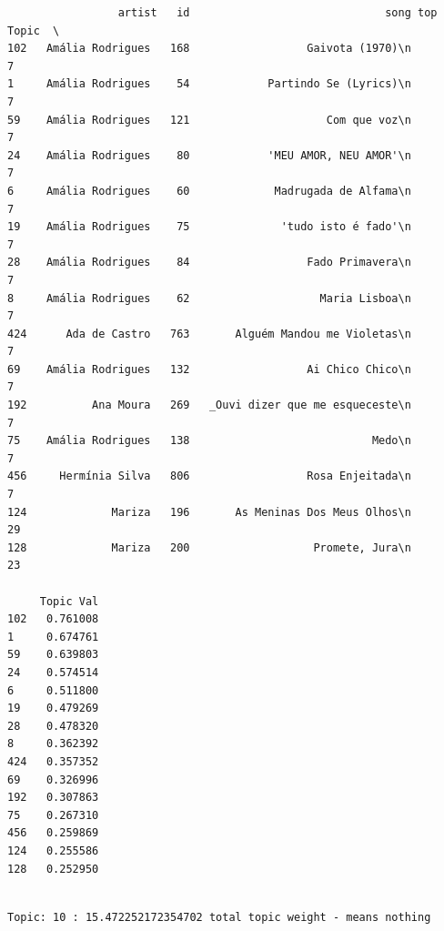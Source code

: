 \documentclass[11pt]{article}
\begin{document}
    
    \begin{verbatim}
                 artist   id                              song top Topic  \
102   Amália Rodrigues   168                  Gaivota (1970)\n         7   
1     Amália Rodrigues    54            Partindo Se (Lyrics)\n         7   
59    Amália Rodrigues   121                     Com que voz\n         7   
24    Amália Rodrigues    80            'MEU AMOR, NEU AMOR'\n         7   
6     Amália Rodrigues    60             Madrugada de Alfama\n         7   
19    Amália Rodrigues    75              'tudo isto é fado'\n         7   
28    Amália Rodrigues    84                  Fado Primavera\n         7   
8     Amália Rodrigues    62                    Maria Lisboa\n         7   
424      Ada de Castro   763       Alguém Mandou me Violetas\n         7   
69    Amália Rodrigues   132                  Ai Chico Chico\n         7   
192          Ana Moura   269   _Ouvi dizer que me esqueceste\n         7   
75    Amália Rodrigues   138                            Medo\n         7   
456     Hermínia Silva   806                  Rosa Enjeitada\n         7   
124             Mariza   196       As Meninas Dos Meus Olhos\n        29   
128             Mariza   200                   Promete, Jura\n        23   

     Topic Val  
102   0.761008  
1     0.674761  
59    0.639803  
24    0.574514  
6     0.511800  
19    0.479269  
28    0.478320  
8     0.362392  
424   0.357352  
69    0.326996  
192   0.307863  
75    0.267310  
456   0.259869  
124   0.255586  
128   0.252950  
    \end{verbatim}

    
    \begin{Verbatim}[commandchars=\\\{\}]

Topic: 10 : 15.472252172354702 total topic weight - means nothing

    \end{Verbatim}
\end{document}

